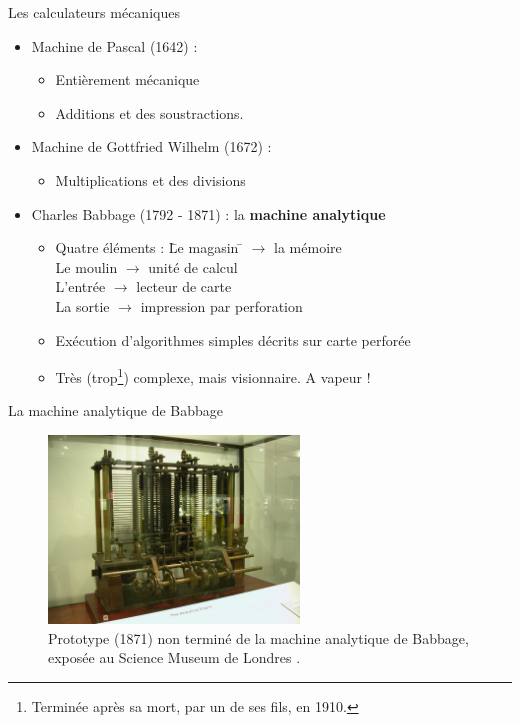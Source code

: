 \begin{frame}{Les calculateurs mécaniques}
\begin{itemize}
\item <1> Machine de Pascal (1642) :
\begin{itemize}
\item Entièrement mécanique
\item Additions et des soustractions.
\end{itemize}
\item <2> Machine de Gottfried Wilhelm (1672) :
\begin{itemize}
\item Multiplications et des divisions
\end{itemize}
\item <3> Charles Babbage (1792 - 1871) : la \textbf{machine analytique}
\begin{itemize}
\item 
\begin{tabbing}
Quatre éléments : \= Le magasin \= $\rightarrow$ la mémoire \\
\>Le moulin \> $\rightarrow$ unité de calcul \\
\>L'entrée \> $\rightarrow$ lecteur de carte \\
\>La sortie \> $\rightarrow$ impression par perforation
\end{tabbing}
\item Exécution d'algorithmes simples décrits sur carte perforée
\item Très (trop\footnote{Terminée après sa mort, par un de ses fils, en 1910.}) complexe, mais visionnaire. A vapeur !
\end{itemize}
\end{itemize}
\end{frame}

\begin{frame}{La machine analytique de Babbage}
\begin{figure}
\includegraphics[height=5cm]{../illustration/AnalyticalMachine_Babbage_London.jpg}
\caption{Prototype (1871) non terminé de la machine analytique de Babbage, exposée au Science Museum de Londres \cite{wp-mab}.}
\end{figure}
\end{frame}

